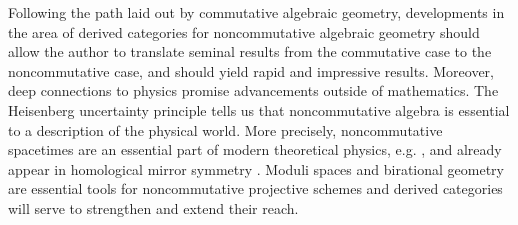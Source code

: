 \documentclass[11pt]{amsart}
\begin{document}
Following the path laid out by commutative algebraic geometry, developments in the area of derived categories for noncommutative algebraic geometry should allow the author to translate seminal results from the commutative case to the noncommutative case, and should yield rapid and impressive results.
Moreover, deep connections to physics promise advancements outside of mathematics.
The Heisenberg uncertainty principle tells us that noncommutative algebra is essential to a description of the physical world.
More precisely, noncommutative spacetimes are an essential part of modern theoretical physics, e.g. \cite{DoNe01}, and already appear in homological mirror symmetry \cite{AKO08}.
Moduli spaces and birational geometry are essential tools for noncommutative projective schemes and derived categories will serve to strengthen and extend their reach.



\end{document}
